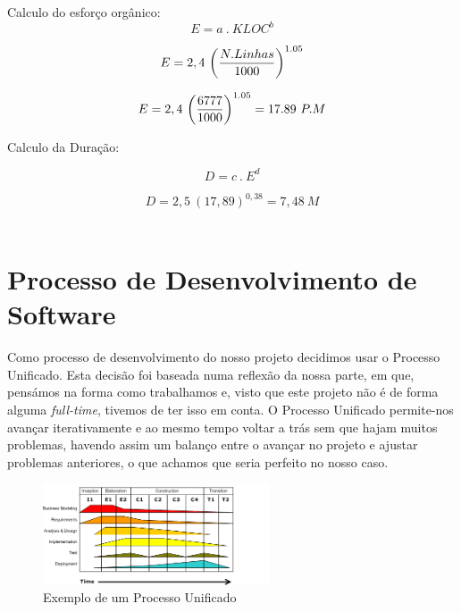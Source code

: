 \documentclass[12pt, a4paper, twoside]{report} %
\begin{document}
Calculo do esforço orgânico:
\\

\begin{equation}
E = a \ . \ KLOC ^ b
\end{equation}

\begin{equation} 
E = 2,4 \ \bigg({N.Linhas \over 1000}\bigg)^{1.05}
\end{equation}

\begin{equation}
{E = 2,4 \ \bigg({6777 \over 1000}\bigg) ^ {1.05}}
= 17.89 \ P.M
\end{equation}

Calculo da Duração:

\begin{equation}
D = c \ . \ E^d
\end{equation}

\begin{equation}
D = 2,5 \ (17,89)^{0,38}= 7,48\ M
\end{equation}
\\
\section{Processo de Desenvolvimento de Software}

Como processo de desenvolvimento do nosso projeto decidimos usar o Processo Unificado.
Esta decisão foi baseada numa reflexão da nossa parte, em que, pensámos na forma como trabalhamos e, visto que este projeto não é de forma alguma \textit{full-time}, tivemos de ter isso em conta. O Processo Unificado permite-nos avançar iterativamente e ao mesmo tempo voltar a trás sem que hajam muitos problemas, havendo assim um balanço entre o avançar no projeto e ajustar problemas anteriores, o que achamos que seria perfeito no nosso caso.
\\

\begin{figure}[h!]
  \centering
	\includegraphics[width=0.6\textwidth]{image1.png}
   \caption{Exemplo de um Processo Unificado}
\end{figure}
\end{document}
